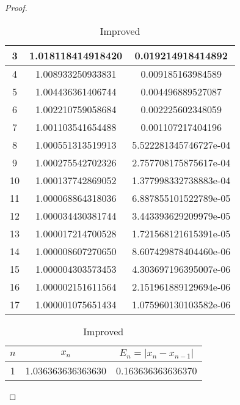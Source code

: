 \begin{enumerate}
\begin{proof}
\begin{table}[H]
\begin{subtable}[t]{.8\textwidth}
\begin{table}[htbp]
\begin{subtable}[t]{.49\linewidth}
\begin{tabular}[t]{|c|c|c|}
			\footnotesize	3	&	\footnotesize	1.018118414918420	&	\footnotesize	0.019214918414892	\\	\hline
			\footnotesize	4	&	\footnotesize	1.008933250933831	&	\footnotesize	0.009185163984589	\\	\hline
			\footnotesize	5	&	\footnotesize	1.004436361406744	&	\footnotesize	0.004496889527087	\\	\hline
			\footnotesize	6	&	\footnotesize	1.002210759058684	&	\footnotesize	0.002225602348059	\\	\hline
			\footnotesize	7	&	\footnotesize	1.001103541654488	&	\footnotesize	0.001107217404196	\\	\hline
			\footnotesize	8	&	\footnotesize	1.000551313519913	&	\footnotesize	5.522281345746727e-04	\\	\hline
			\footnotesize	9	&	\footnotesize	1.000275542702326	&	\footnotesize	2.757708175875617e-04	\\	\hline
			\footnotesize	10	&	\footnotesize	1.000137742869052	&	\footnotesize	1.377998332738883e-04	\\	\hline
			\footnotesize	11	&	\footnotesize	1.000068864318036	&	\footnotesize	6.887855101522789e-05	\\	\hline
			\footnotesize	12	&	\footnotesize	1.000034430381744	&	\footnotesize	3.443393629209979e-05	\\	\hline
			\footnotesize	13	&	\footnotesize	1.000017214700528	&	\footnotesize	1.721568121615391e-05	\\	\hline
			\footnotesize	14	&	\footnotesize	1.000008607270650	&	\footnotesize	8.607429878404460e-06	\\	\hline
			\footnotesize	15	&	\footnotesize	1.000004303573453	&	\footnotesize	4.303697196395007e-06	\\	\hline
			\footnotesize	16	&	\footnotesize	1.000002151611564	&	\footnotesize	2.151961889129694e-06	\\	\hline
			\footnotesize	17	&	\footnotesize	1.000001075651434	&	\footnotesize	1.075960130103582e-06	\\	\hline
			\end{tabular}
		\end{subtable}
		\ifnum{}
			\begin{subtable}[t]{.8\textwidth}
			\centering
			\caption{Improved}
			\begin{tabular}{|c|c|c|}
				\hline
				$n$ & \(x_n\)				&	\(E_n=|x_n-x_{n-1}|\)	\\	\hline
				\footnotesize	1	&	\footnotesize	1.036363636363630	&	\footnotesize	0.163636363636370	\\	\hline

\end{tabular}
\end{subtable}
\end{table}
\end{subtable}
\end{table}
\end{proof}
\end{enumerate}
